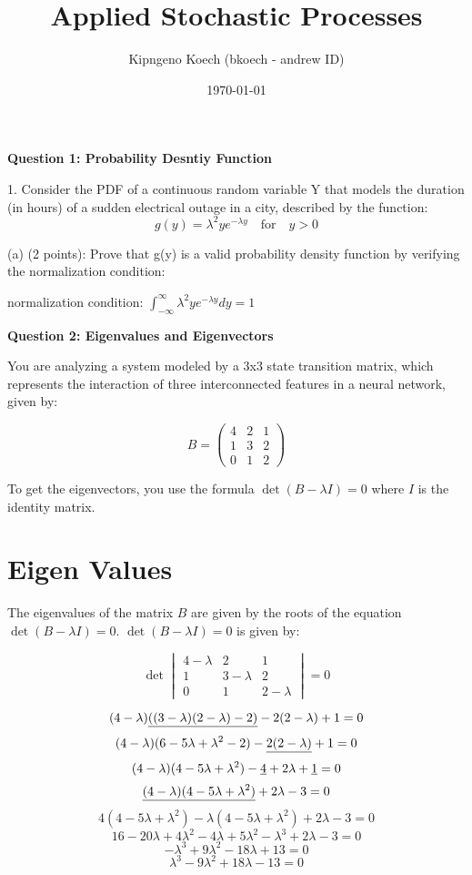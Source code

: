 \documentclass{article}
\title{Applied Stochastic Processes}
\author{Kipngeno Koech (bkoech - andrew ID)}
\date{\today}
\begin{document}
\maketitle
\begin{center}
    \large \textbf{Question 1: Probability Desntiy Function}
\end{center}

1. Consider the PDF of a continuous random variable Y that models the duration (in hours) of a
sudden electrical outage in a city, described by the function:
\[g(y) = \lambda^2ye^{-\lambda y} \quad \text{for} \quad y > 0\]

(a) (2 points): Prove that g(y) is a valid probability density function by verifying the normalization
condition:\newline

normalization condition: \(\int_{-\infty}^{\infty}\lambda^2ye^{-\lambda y}dy = 1\)



\begin{center}
    \large \textbf{Question 2: Eigenvalues and Eigenvectors}
\end{center}
You are analyzing a system modeled by a 3x3 state transition matrix, which represents the interaction
of three interconnected features in a neural network, given by:

\[
B =
\begin{pmatrix}
4 & 2 & 1 \\
1 & 3 & 2 \\
0 & 1 & 2
\end{pmatrix}
\]

To get the eigenvectors, you use the formula \(\det(B - \lambda I) = 0\) where \(I\) is the identity matrix.

\section{Eigen Values}
The eigenvalues of the matrix \(B\) are given by the roots of the equation \(\det(B - \lambda I) = 0\).
\(\det(B - \lambda I) = 0\) is given by:

\[
\det\begin{vmatrix}
4-\lambda & 2 & 1 \\
1 & 3-\lambda & 2 \\
0 & 1 & 2-\lambda
\end{vmatrix} = 0
\]

\[(4-\lambda)\uline{((3-\lambda)(2-\lambda) - 2)} - 2(2-\lambda) + 1  = 0\]
\[(4-\lambda)(6 - 5\lambda + \lambda^2 - 2) - \uline{2(2-\lambda)} + 1 = 0\]
\[(4-\lambda)(4 - 5\lambda + \lambda^2) -\uline{4} + 2\lambda + \uline{1} = 0\]
\[\uline{(4-\lambda)(4 - 5\lambda + \lambda^2)} + 2\lambda - 3 = 0\]
\[4(4 - 5\lambda + \lambda^2) - \lambda(4 - 5\lambda + \lambda^2) + 2\lambda - 3 = 0\]
\[16 - 20\lambda + 4\lambda^2 - 4\lambda + 5\lambda^2 - \lambda^3 + 2\lambda - 3 = 0\]
\[-\lambda^3 + 9\lambda^2 - 18\lambda + 13 = 0\]
\[\lambda^3 - 9\lambda^2 + 18\lambda - 13 = 0\]
\end{document}
